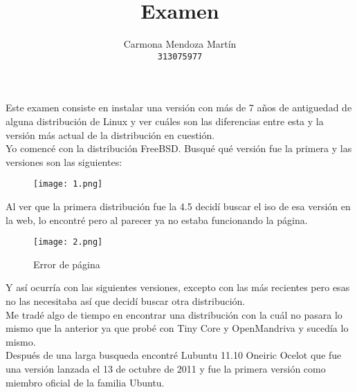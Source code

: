\documentclass[11pt, a4paper]{report}
\begin{document}
\title{Examen}
\author{
  Carmona Mendoza Martín\\
  \texttt{313075977}
}
\date{}
\maketitle

Este examen consiste en instalar una versión con más de 7 años de antiguedad de
alguna distribución de Linux y ver cuáles son las diferencias entre esta y la
versión más actual de la distribución en cuestión. \\

Yo comencé con la distribución FreeBSD. Busqué qué versión fue la primera y las
versiones son las siguientes: \\

\begin{figure}[!ht] 
    \begin{center}  
      \texttt{[image: 1.png]} 
      \caption{} 
    \end{center} 
  \end{figure} 

Al ver que la primera distribución fue la 4.5 decidí buscar el iso de esa
versión en la web, lo encontré pero al parecer ya no estaba funcionando la
página. \\

  \begin{figure}[!ht] 
    \begin{center}  
      \texttt{[image: 2.png]} 
      \caption{Error de página} 
    \end{center} 
  \end{figure}

  Y así ocurría con las siguientes versiones, excepto con las más recientes pero
  esas no las necesitaba así que decidí buscar otra distribución. \\

  Me tradé algo de tiempo en encontrar una distribución con la cuál no pasara lo
  mismo que la anterior ya que probé con Tiny Core y OpenMandriva y sucedía lo
  mismo. \\

  Después de una larga busqueda encontré Lubuntu 11.10 Oneiric Ocelot que fue
  una versión lanzada el 13 de octubre de 2011 y fue la primera versión como
  miembro oficial de la familia Ubuntu.  \\

  
\end{document}
